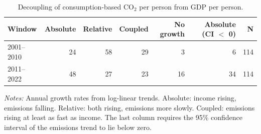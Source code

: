 \begin{table}[tbp]
\centering
\small
\caption{Decoupling of consumption-based CO$_2$ per person from GDP per person.}
\label{tab:decoupling}
\begin{threeparttable}
\begin{tabular}{lrrrrrr}
\toprule
Window & Absolute & Relative & Coupled & No growth & Absolute (CI $<$ 0) & N \\
\midrule
2001--2010 & 24 & 58 & 29 & 3 & 6 & 114 \\
2011--2022 & 48 & 27 & 23 & 16 & 34 & 114 \\
\bottomrule
\end{tabular}
\begin{tablenotes}[flushleft]
\footnotesize
\item \textit{Notes:} Annual growth rates from log-linear trends. Absolute: income rising, emissions falling. Relative: both rising, emissions more slowly. Coupled: emissions rising at least as fast as income. The last column requires the 95\% confidence interval of the emissions trend to lie below zero.
\end{tablenotes}
\end{threeparttable}
\end{table}
